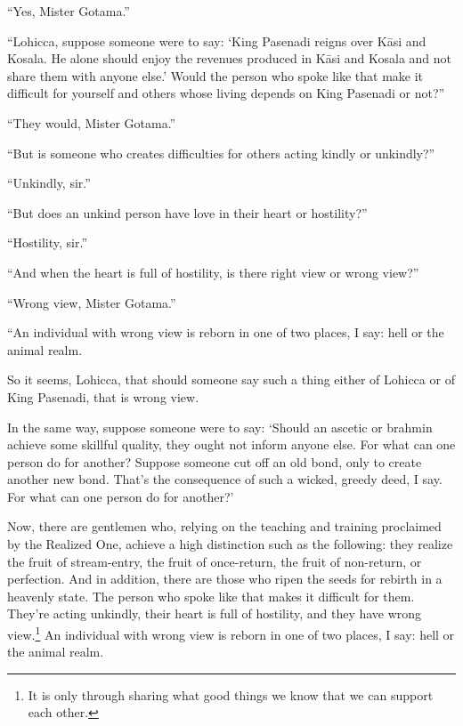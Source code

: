 \documentclass[12pt,openany]{book}%
\begin{document}
“Yes, Mister Gotama.” 

“Lohicca, suppose someone were to say: ‘King Pasenadi reigns over \textsanskrit{Kāsi} and Kosala. He alone should enjoy the revenues produced in \textsanskrit{Kāsi} and Kosala and not share them with anyone else.’ Would the person who spoke like that make it difficult for yourself and others whose living depends on King Pasenadi or not?” 

“They would, Mister Gotama.” 

“But is someone who creates difficulties for others acting kindly or unkindly?” 

“Unkindly, sir.” 

“But does an unkind person have love in their heart or hostility?” 

“Hostility, sir.” 

“And when the heart is full of hostility, is there right view or wrong view?” 

“Wrong view, Mister Gotama.” 

“An individual with wrong view is reborn in one of two places, I say: hell or the animal realm. 

So it seems, Lohicca, that should someone say such a thing either of Lohicca or of King Pasenadi, that is wrong view. 

In the same way, suppose someone were to say: ‘Should an ascetic or brahmin achieve some skillful quality, they ought not inform anyone else. For what can one person do for another? Suppose someone cut off an old bond, only to create another new bond. That’s the consequence of such a wicked, greedy deed, I say. For what can one person do for another?’ 

Now, there are gentlemen who, relying on the teaching and training proclaimed by the Realized One, achieve a high distinction such as the following: they realize the fruit of stream-entry, the fruit of once-return, the fruit of non-return, or perfection. And in addition, there are those who ripen the seeds for rebirth in a heavenly state. The person who spoke like that makes it difficult for them. They’re acting unkindly, their heart is full of hostility, and they have wrong view.\footnote{It is only through sharing what good things we know that we can support each other. } An individual with wrong view is reborn in one of two places, I say: hell or the animal realm. 
\end{document}
